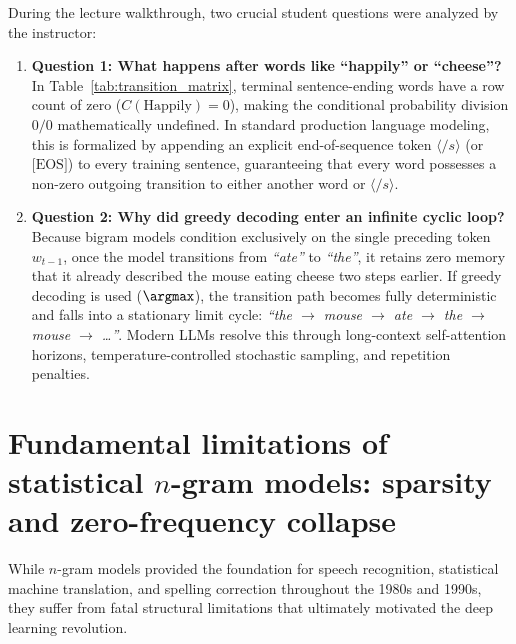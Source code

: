\documentclass[../../main.tex]{subfiles}
\begin{document}
\begin{examinsight}
During the lecture walkthrough, two crucial student questions were analyzed by the instructor:
\begin{enumerate}
    \item \textbf{Question 1: What happens after words like ``happily'' or ``cheese''?} \\
    In Table~\ref{tab:transition_matrix}, terminal sentence-ending words have a row count of zero ($C(\text{Happily}) = 0$), making the conditional probability division $0/0$ mathematically undefined. In standard production language modeling, this is formalized by appending an explicit end-of-sequence token $\langle /s \rangle$ (or $\text{[EOS]}$) to every training sentence, guaranteeing that every word possesses a non-zero outgoing transition to either another word or $\langle /s \rangle$.
    \item \textbf{Question 2: Why did greedy decoding enter an infinite cyclic loop?} \\
    Because bigram models condition exclusively on the single preceding token $w_{t-1}$, once the model transitions from \textit{``ate''} to \textit{``the''}, it retains zero memory that it already described the mouse eating cheese two steps earlier. If greedy decoding is used ($\argmax$), the transition path becomes fully deterministic and falls into a stationary limit cycle: \textit{``the $\to$ mouse $\to$ ate $\to$ the $\to$ mouse $\to$ \dots''}. Modern LLMs resolve this through long-context self-attention horizons, temperature-controlled stochastic sampling, and repetition penalties.
\end{enumerate}
\end{examinsight}


\section{Fundamental limitations of statistical $n$-gram models: sparsity and zero-frequency collapse}
\label{sec:ngram_limitations}

While $n$-gram models provided the foundation for speech recognition, statistical machine translation, and spelling correction throughout the 1980s and 1990s, they suffer from fatal structural limitations that ultimately motivated the deep learning revolution.
\end{document}
